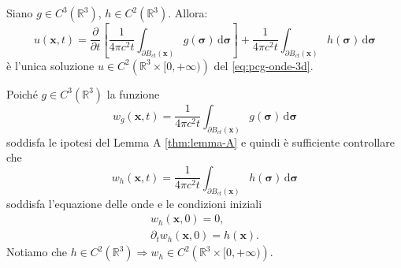 \documentclass[10pt,a4paper,twoside,openright]{book}
\newcommand{\x}{\mathbf{x}}
\newcommand{\sigg}{\bm{\sigma}}
\newcommand{\de}{\,\mathrm d}
\newcommand{\dsig}{\de \sigg}
\begin{document}
\begin{theorem}
	 Siano $\displaystyle g\in C^{3}\left(\mathbb{R}^{3}\right)$, $\displaystyle h\in C^{2}\left(\mathbb{R}^{3}\right)$. Allora:
	\begin{equation}
		u(\x ,t) =\frac{\partial }{\partial t}\left[\frac{1}{4\pi c^{2} t}\int _{\partial B_{ct}(\x)} g(\sigg) \dsig\right] +\frac{1}{4\pi c^{2} t}\int _{\partial B_{ct}(\x)} h(\sigg) \dsig
	\end{equation}
	è l'unica soluzione $\displaystyle u\in C^{2}\left(\mathbb{R}^{3} \times [ 0,+\infty)\right)$ del \eqref{eq:pcg-onde-3d}.
\end{theorem}
\begin{dimostrazione}
	Poiché $\displaystyle g\in C^{3}\left(\mathbb{R}^{3}\right)$ la funzione
	\begin{equation*}
		w_{g}(\x ,t) =\frac{1}{4\pi c^{2} t}\int _{\partial B_{ct}(\x)} g(\sigg) \dsig
	\end{equation*}
	soddisfa le ipotesi del Lemma A \ref{thm:lemma-A} e quindi è sufficiente controllare che
	\begin{equation*}
		w_{h}(\x ,t) =\frac{1}{4\pi c^{2} t}\int _{\partial B_{ct}(\x)} h(\sigg) \dsig
	\end{equation*}
	soddisfa l'equazione delle onde e le condizioni iniziali
	\begin{gather*}
		w_{h}(\x ,0) =0,\\
		\partial _{t} w_{h}(\x ,0) =h(\x) .
	\end{gather*}
	Notiamo che $\displaystyle h\in C^{2}\left(\mathbb{R}^{3}\right) \Rightarrow w_{h} \in C^{2}\left(\mathbb{R}^{3} \times [ 0,+\infty)\right)$.


\end{dimostrazione}
\end{document}
